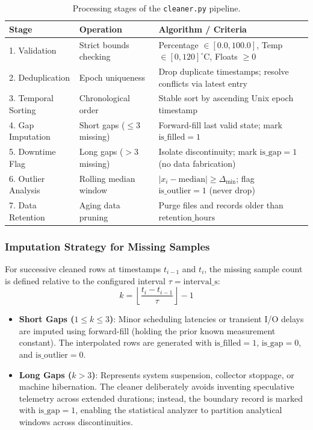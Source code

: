 \begin{table}[htbp]
\centering
\small
\begin{tabularx}{\textwidth}{llX}
\toprule
\textbf{Stage} & \textbf{Operation} & \textbf{Algorithm / Criteria} \\
\midrule
1. Validation & Strict bounds checking & Percentage $\in [0.0, 100.0]$, Temp $\in [0, 120]^\circ\text{C}$, Floats $\ge 0$ \\
2. Deduplication & Epoch uniqueness & Drop duplicate timestamps; resolve conflicts via latest entry \\
3. Temporal Sorting & Chronological order & Stable sort by ascending Unix epoch timestamp \\
4. Gap Imputation & Short gaps ($\le 3$ missing) & Forward-fill last valid state; mark $\text{is\_filled}=1$ \\
5. Downtime Flag & Long gaps ($> 3$ missing) & Isolate discontinuity; mark $\text{is\_gap}=1$ (no data fabrication) \\
6. Outlier Analysis & Rolling median window & $|x_i - \text{median}| \ge \Delta_{\min}$; flag $\text{is\_outlier}=1$ (never drop) \\
7. Data Retention & Aging data pruning & Purge files and records older than $\text{retention\_hours}$ \\
\bottomrule
\end{tabularx}
\caption{Processing stages of the \texttt{cleaner.py} pipeline.}
\label{tab:cleaner_stages}
\end{table}

\subsubsection{Imputation Strategy for Missing Samples}
For successive cleaned rows at timestamps $t_{i-1}$ and $t_i$, the missing sample count is defined relative to the configured interval $\tau = \text{interval\_s}$:
\begin{equation}
    k = \left\lfloor \frac{t_i - t_{i-1}}{\tau} \right\rfloor - 1
\end{equation}
\begin{itemize}
    \item \textbf{Short Gaps ($1 \le k \le 3$)}: Minor scheduling latencies or transient I/O delays are imputed using forward-fill (holding the prior known measurement constant). The interpolated rows are generated with $\text{is\_filled} = 1$, $\text{is\_gap} = 0$, and $\text{is\_outlier} = 0$.
    \item \textbf{Long Gaps ($k > 3$)}: Represents system suspension, collector stoppage, or machine hibernation. The cleaner deliberately avoids inventing speculative telemetry across extended durations; instead, the boundary record is marked with $\text{is\_gap} = 1$, enabling the statistical analyzer to partition analytical windows across discontinuities.
\end{itemize}

